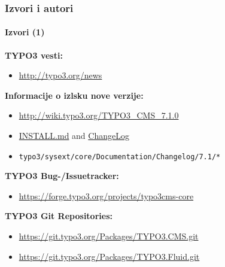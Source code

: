 \begin{frame}[fragile]
	\frametitle{Izvori i autori}
	\framesubtitle{Izvori (1)}

	\textbf{TYPO3 vesti:}
		\begin{itemize}\smaller
			\item \url{http://typo3.org/news}
		\end{itemize}

	\textbf{Informacije o izlsku nove verzije:}
		\begin{itemize}\smaller
			\item \url{http://wiki.typo3.org/TYPO3_CMS_7.1.0}
			\item \href{https://github.com/TYPO3/TYPO3.CMS/blob/master/INSTALL.md}{INSTALL.md} and \href{https://github.com/TYPO3/TYPO3.CMS/blob/master/ChangeLog}{ChangeLog}
			\item \texttt{typo3/sysext/core/Documentation/Changelog/7.1/*}
		\end{itemize}

	\textbf{TYPO3 Bug-/Issuetracker:}
		\begin{itemize}\smaller
			\item \url{https://forge.typo3.org/projects/typo3cms-core}
		\end{itemize}

	\textbf{TYPO3 Git Repositories:}
		\begin{itemize}\smaller
			\item \url{https://git.typo3.org/Packages/TYPO3.CMS.git}
			\item \url{https://git.typo3.org/Packages/TYPO3.Fluid.git}
		\end{itemize}

\end{frame}


